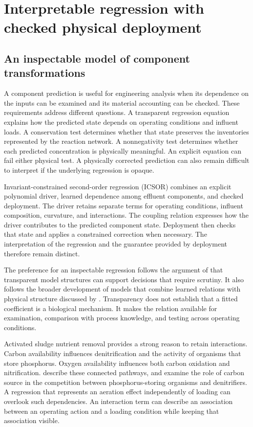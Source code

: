 \chapter{Interpretable regression with checked physical deployment}
\label{ch:interpretable}

\section{An inspectable model of component transformations}

A component prediction is useful for engineering analysis when its dependence on the inputs can be examined and its material accounting can be checked. These requirements address different questions. A transparent regression equation explains how the predicted state depends on operating conditions and influent loads. A conservation test determines whether that state preserves the inventories represented by the reaction network. A nonnegativity test determines whether each predicted concentration is physically meaningful. An explicit equation can fail either physical test. A physically corrected prediction can also remain difficult to interpret if the underlying regression is opaque.

Invariant-constrained second-order regression (ICSOR) combines an explicit polynomial driver, learned dependence among effluent components, and checked deployment. The driver retains separate terms for operating conditions, influent composition, curvature, and interactions. The coupling relation expresses how the driver contributes to the predicted component state. Deployment then checks that state and applies a constrained correction when necessary. The interpretation of the regression and the guarantee provided by deployment therefore remain distinct.

The preference for an inspectable regression follows the argument of \citet{Rudin2019} that transparent model structures can support decisions that require scrutiny. It also follows the broader development of models that combine learned relations with physical structure discussed by \citet{Shen2023}. Transparency does not establish that a fitted coefficient is a biological mechanism. It makes the relation available for examination, comparison with process knowledge, and testing across operating conditions.

Activated sludge nutrient removal provides a strong reason to retain interactions. Carbon availability influences denitrification and the activity of organisms that store phosphorus. Oxygen availability influences both carbon oxidation and nitrification. \citet{Wentzel1992} describe these connected pathways, and \citet{Guerrero2011} examine the role of carbon source in the competition between phosphorus-storing organisms and denitrifiers. A regression that represents an aeration effect independently of loading can overlook such dependencies. An interaction term can describe an association between an operating action and a loading condition while keeping that association visible.

